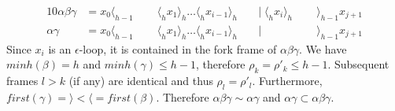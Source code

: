 \documentclass[AMA,STIX1COL]{WileyNJD-v2}
\newcommand{\Xl}{\langle}
\newcommand{\Xr}{\rangle}
\begin{document}
\begin{proofEnd}
\begin{enumerate}[itemsep=0.5em, topsep=0.5em]
\begin{alignat*}{10}
            \alpha \beta \gamma &= x_0 \Xl_{h-1} \;&&\; \Xl_h x_1 \Xr_h \hdots \Xl_h x_{i-1} \Xr_h \;&&\big|\; \Xl_h x_{i} \Xr_h \;&&\; \Xr_{h-1} x_{j+1} \\[-0.5em]
            \alpha \gamma       &= x_0 \Xl_{h-1} \;&&\; \Xl_h x_1 \Xr_h \hdots \Xl_h x_{i-1} \Xr_h \;&&\big|\;                   \;&&\; \Xr_{h-1} x_{j+1}
        \end{alignat*}
        Since $x_i$ is an $\epsilon$-loop, it is contained in the fork frame of $\alpha \beta \gamma$.
        We have $minh (\beta) = h$ and $minh (\gamma) \leq h - 1$, therefore $\rho_k = \rho'_k \leq h - 1$.
        Subsequent frames $l > k$ (if any) are identical and thus $\rho_l = \rho'_l$.
        Furthermore, $first (\gamma) = \Xr < \Xl = first (\beta)$.
        Therefore $\alpha \beta \gamma \sim \alpha \gamma$ and $\alpha \gamma \subset \alpha \beta \gamma$.


\end{enumerate}
\end{proofEnd}
\end{document}
